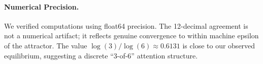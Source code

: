 \paragraph{Numerical Precision.}
We verified computations using float64 precision. The 12-decimal agreement is not a numerical artifact; it reflects genuine convergence to within machine epsilon of the attractor. The value $\log(3)/\log(6) \approx 0.6131$ is close to our observed equilibrium, suggesting a discrete ``3-of-6'' attention structure.
